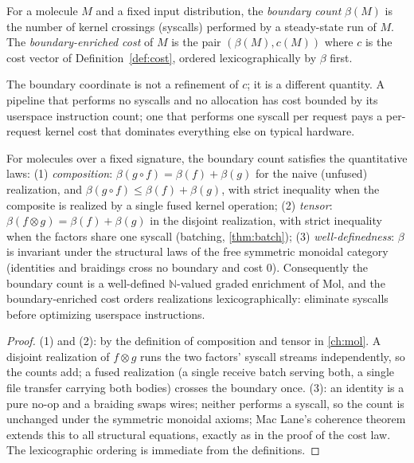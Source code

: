 \begin{definition}\label{def:boundary}
For a molecule $M$ and a fixed input distribution, the \emph{boundary
count} $\beta (M)$ is the number of kernel crossings (syscalls)
performed by a steady-state run of $M$. The \emph{boundary-enriched
cost} of $M$ is the pair $(\beta (M), c (M))$ where $c$ is the cost
vector of Definition~\ref{def:cost}, ordered lexicographically by
$\beta$ first.
\end{definition}

The boundary coordinate is not a refinement of $c$; it is a different
quantity. A pipeline that performs no syscalls and no allocation has
cost bounded by its userspace instruction count; one that performs one
syscall per request pays a per-request kernel cost that dominates
everything else on typical hardware.

\begin{theorem}\label{thm:boundary}
For molecules over a fixed signature, the boundary count satisfies the
quantitative laws:
(1) \emph{composition}: $\beta (g \circ f) = \beta (f) + \beta (g)$ for
the naive (unfused) realization, and $\beta (g \circ f) \leq \beta (f) +
\beta (g)$, with strict inequality when the composite is realized by a
single fused kernel operation;
(2) \emph{tensor}: $\beta (f \otimes g) = \beta (f) + \beta (g)$ in the
disjoint realization, with strict inequality when the factors share one
syscall (batching, \autoref{thm:batch});
(3) \emph{well-definedness}: $\beta$ is invariant under the structural
laws of the free symmetric monoidal category (identities and braidings
cross no boundary and cost $0$).
Consequently the boundary count is a well-defined
$\mathbb{N}$-valued graded enrichment of Mol, and the
boundary-enriched cost orders realizations lexicographically:
eliminate syscalls before optimizing userspace instructions.
\end{theorem}

\begin{proof}
(1) and (2): by the definition of composition and tensor in
\autoref{ch:mol}. A disjoint realization of $f \otimes g$ runs the two
factors' syscall streams independently, so the counts add; a fused
realization (a single receive batch serving both, a single file
transfer carrying both bodies) crosses the boundary once. (3): an
identity is a pure no-op and a braiding swaps wires; neither performs
a syscall, so the count is unchanged under the symmetric monoidal
axioms; Mac Lane's coherence theorem \citep{maclane} extends this to
all structural equations, exactly as in the proof of the cost law.
The lexicographic ordering is immediate from the definitions.
\end{proof}

